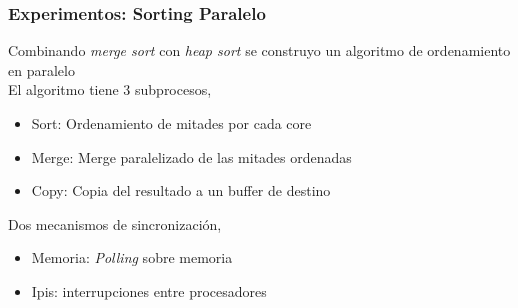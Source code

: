 \documentclass{beamer}
\begin{document}
\begin{frame}
  \frametitle{Experimentos: Sorting Paralelo}
  Combinando \emph{merge sort} con \emph{heap sort} se construyo un algoritmo de ordenamiento en paralelo\\
  \vspace{10pt}
  El algoritmo tiene 3 subprocesos,\\
  \vspace{10pt}
  \begin{itemize}
  \item Sort: Ordenamiento de mitades por cada core
  \item Merge: Merge paralelizado de las mitades ordenadas
  \item Copy: Copia del resultado a un buffer de destino
  \end{itemize}
  \vspace{10pt}
  Dos mecanismos de sincronización,\\
  \vspace{10pt}
  \begin{itemize}
  \item Memoria: \emph{Polling} sobre memoria
  \item Ipis: interrupciones entre procesadores
  \end{itemize}
\end{frame}

% 
\end{document}
